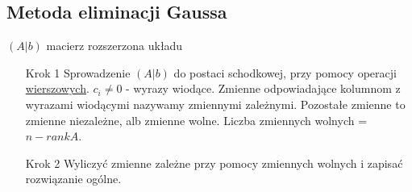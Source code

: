 \subsection{Metoda eliminacji Gaussa} 
    $(A |b)$ macierz rozszerzona układu    
    \begin{itemize} 
        \item[Krok 1]   Sprowadzenie $(A |b)$ do postaci schodkowej, przy pomocy operacji \underline{wierszowych}. 
        $c_i \neq 0$ - wyrazy wiodące. Zmienne odpowiadające kolumnom z wyrazami wiodącymi nazywamy zmiennymi
        zależnymi. Pozostałe zmienne to zmienne niezależne, alb zmienne wolne. 
        Liczba zmiennych wolnych = $n - rank A$. 
        \item[Krok 2] Wyliczyć zmienne zależne przy pomocy zmiennych wolnych i zapisać rozwiązanie ogólne.
    \end{itemize} 
